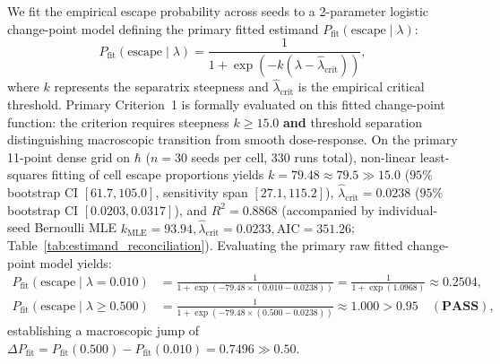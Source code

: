 \documentclass{article}
\theoremstyle{plain}
\theoremstyle{definition}
\begin{document}
We fit the empirical escape probability across seeds to a 2-parameter logistic change-point model defining the primary fitted estimand $P_{\text{fit}}(\text{escape} \mid \lambda)$:
\begin{equation}
    P_{\text{fit}}(\text{escape} \mid \lambda) = \frac{1}{1 + \exp\left(-k (\lambda - \hat{\lambda}_{\text{crit}})\right)},
    \label{eq:logistic_fit}
\end{equation}
where $k$ represents the separatrix steepness and $\hat{\lambda}_{\text{crit}}$ is the empirical critical threshold. Primary Criterion~1 is formally evaluated on this fitted change-point function: the criterion requires steepness $k \ge 15.0$ \textbf{and} threshold separation distinguishing macroscopic transition from smooth dose-response. On the primary 11-point dense grid on $\hbar$ ($n=30$ seeds per cell, 330 runs total), non-linear least-squares fitting of cell escape proportions yields $k = 79.48 \approx 79.5 \gg 15.0$ ($95\%$ bootstrap CI $[61.7, 105.0]$, sensitivity span $[27.1, 115.2]$), $\hat{\lambda}_{\text{crit}} = 0.0238$ ($95\%$ bootstrap CI $[0.0203, 0.0317]$), and $R^2 = 0.8868$ (accompanied by individual-seed Bernoulli MLE $k_{\text{MLE}} = 93.94, \hat{\lambda}_{\text{crit}} = 0.0233, \text{AIC} = 351.26$; Table~\ref{tab:estimand_reconciliation}). Evaluating the primary raw fitted change-point model yields:
\begin{align}
    P_{\text{fit}}(\text{escape} \mid \lambda = 0.010) &= \frac{1}{1 + \exp\left(-79.48 \times (0.010 - 0.0238)\right)} = \frac{1}{1 + \exp(1.0968)} \approx 0.2504, \\
    P_{\text{fit}}(\text{escape} \mid \lambda \ge 0.500) &= \frac{1}{1 + \exp\left(-79.48 \times (0.500 - 0.0238)\right)} \approx 1.000 > 0.95 \quad (\mathbf{PASS}),
\end{align}
establishing a macroscopic jump of $\Delta P_{\text{fit}} = P_{\text{fit}}(0.500) - P_{\text{fit}}(0.010) = 0.7496 \gg 0.50$.
\end{document}
